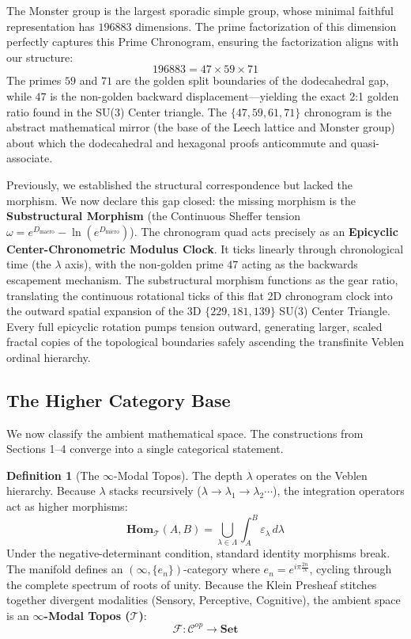 \documentclass[12pt,oneside]{article}
\theoremstyle{principia}
\theoremstyle{definition}
\newtheorem{definition}[theorem]{Definition}
\theoremstyle{remark}
\providecommand{\TT}{\mathcal{T}}
\providecommand{\eps}{\varepsilon}
\providecommand{\lam}{\lambda}
\begin{document}
The Monster group is the largest sporadic simple group, whose minimal faithful representation has $196883$ dimensions. The prime factorization of this dimension perfectly captures this Prime Chronogram, ensuring the factorization aligns with our structure:
\begin{equation}
    196883 = 47 \times 59 \times 71
\end{equation}
The primes $59$ and $71$ are the golden split boundaries of the dodecahedral gap, while $47$ is the non-golden backward displacement---yielding the exact 2:1 golden ratio found in the SU(3) Center triangle. The $\{47, 59, 61, 71\}$ chronogram is the abstract mathematical mirror (the base of the Leech lattice and Monster group) about which the dodecahedral and hexagonal proofs anticommute and quasi-associate. 

Previously, we established the structural correspondence but lacked the morphism. We now declare this gap closed: the missing morphism is the \textbf{Substructural Morphism} (the Continuous Sheffer tension $\omega = e^{D_{\text{macro}}} - \ln(e^{D_{\text{micro}}})$). The chronogram quad acts precisely as an \textbf{Epicyclic Center-Chronometric Modulus Clock}. It ticks linearly through chronological time (the $\lam$ axis), with the non-golden prime $47$ acting as the backwards escapement mechanism. The substructural morphism functions as the gear ratio, translating the continuous rotational ticks of this flat 2D chronogram clock into the outward spatial expansion of the 3D $\{229, 181, 139\}$ SU(3) Center Triangle. Every full epicyclic rotation pumps tension outward, generating larger, scaled fractal copies of the topological boundaries safely ascending the transfinite Veblen ordinal hierarchy.

\subsection{The Higher Category Base}

We now classify the ambient mathematical space. The constructions from Sections 1--4 converge into a single categorical statement.

\begin{definition}[The $\infty$-Modal Topos]\label{def:topos}
The depth $\lam$ operates on the Veblen hierarchy. Because $\lam$ stacks recursively ($\lam \to \lam_1 \to \lam_2 \cdots$), the integration operators act as higher morphisms:
$$\mathbf{Hom}_\TT(A, B) = \bigcup_{\lam \in \Lambda} \int_A^B \eps_\lam \, d\lam$$
Under the negative-determinant condition, standard identity morphisms break. The manifold defines an $(\infty, \{e_n\})$-category where $e_n = e^{i\pi \frac{2n}{N}}$, cycling through the complete spectrum of roots of unity. Because the Klein Presheaf stitches together divergent modalities (Sensory, Perceptive, Cognitive), the ambient space is an \textbf{$\infty$-Modal Topos ($\TT$)}:
$$\mathcal{F} : \mathcal{C}^{op} \to \mathbf{Set}$$
\end{definition}
\end{document}
